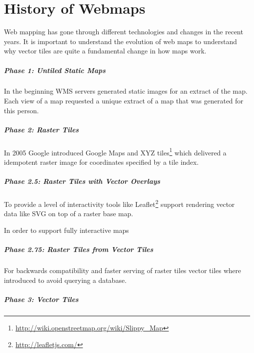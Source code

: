 \chapter{History of Webmaps}
\label{history-of-webmaps}

Web mapping has gone through different technologies and changes in
the recent years. It is important to understand the evolution of web maps to understand why vector tiles are quite a fundamental change in how maps work.

\paragraph{Phase 1: Untiled Static
Maps}

In the beginning WMS servers generated static images for an extract
of the map. Each view of a map requested a unique extract of a map that was generated for this person.


\paragraph{Phase 2: Raster Tiles}

In 2005 Google introduced Google Maps and XYZ 
tiles\footnote{\url{http://wiki.openstreetmap.org/wiki/Slippy_Map}}
which delivered a idempotent raster image for coordinates specified by a
tile index.


\paragraph{Phase 2.5: Raster Tiles with Vector
Overlays}

To provide a level of interactivity tools like
Leaflet\footnote{\url{http://leafletjs.com/}} support rendering vector
data like SVG on top of a raster base map.

In order to support fully interactive maps 

\paragraph{Phase 2.75: Raster Tiles from Vector
Tiles}

For backwards compatibility and faster serving of raster tiles vector
tiles where introduced to avoid querying a database.

\paragraph{Phase 3: Vector Tiles}

